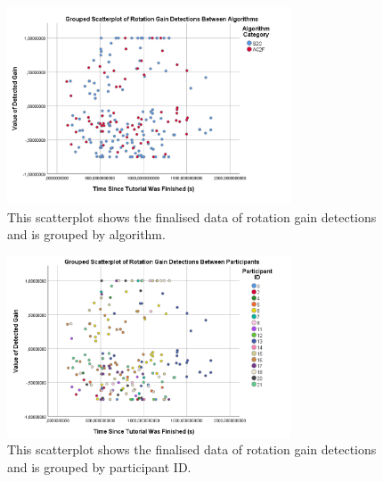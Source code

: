 \begin{figure}[tbph]
    \centering
    \includegraphics[width=0.75\textwidth]{figures/graphs/ProcessedRotationDetections.png}
    \caption[Finalised Detection Scatterplot For Rotation Gains, Grouped by Algorithm]{This scatterplot shows the finalised data of rotation gain detections and is grouped by algorithm.}
    \label{fig:rotationDetectionDataByAlgorithm}
\end{figure}

\begin{figure}[tbph]
    \centering
    \includegraphics[width=0.75\textwidth]{figures/graphs/ProcessedRotationDetectionsByParticipant.png}
    \caption[Finalised Detection Scatterplot For Rotation Gains, Grouped by Participant ID]{This scatterplot shows the finalised data of rotation gain detections and is grouped by participant ID.}
    \label{fig:rotationDetectionDataByParticipant}
\end{figure}

